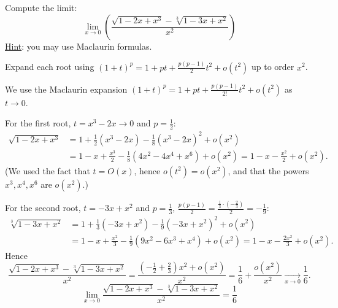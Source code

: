 
\begin{question}
Compute the limit:
\[ \lim_{x\to0}\left(\frac{\sqrt{1-2x+x^3}-\sqrt[3]{1-3x+x^2}}{x^2}\right) \]
\underline{Hint}: you may use Maclaurin formulas.
\end{question}

\begin{hint}
Expand each root using $(1+t)^p=1+pt+\frac{p(p-1)}{2}t^2+o(t^2)$ up to order $x^2$.
\end{hint}

\begin{solution}
We use the Maclaurin expansion $(1+t)^p=1+pt+\frac{p(p-1)}{2!}t^2+o(t^2)$ as $t\to0$.

For the first root, $t=x^3-2x\to0$ and $p=\frac12$:
\begin{align*}
\sqrt{1-2x+x^3}&=1+\frac12(x^3-2x)-\frac18(x^3-2x)^2+o(x^2)\\
&=1-x+\frac{x^3}{2}-\frac18\left(4x^2-4x^4+x^6\right)+o(x^2)=1-x-\frac{x^2}{2}+o(x^2).
\end{align*}
(We used the fact that $t=O(x)$, hence $o(t^2)=o(x^2)$, and that the powers $x^3,x^4,x^6$ are $o(x^2)$.)

For the second root, $t=-3x+x^2$ and $p=\frac13$, $\frac{p(p-1)}{2}=\frac{\frac13\cdot(-\frac23)}{2}=-\frac19$:
\begin{align*}
\sqrt[3]{1-3x+x^2}&=1+\frac13(-3x+x^2)-\frac19(-3x+x^2)^2+o(x^2)\\
&=1-x+\frac{x^2}{3}-\frac19\left(9x^2-6x^3+x^4\right)+o(x^2)=1-x-\frac{2x^2}{3}+o(x^2).
\end{align*}
Hence
\[ \frac{\sqrt{1-2x+x^3}-\sqrt[3]{1-3x+x^2}}{x^2}=\frac{\left(-\frac12+\frac23\right)x^2+o(x^2)}{x^2}=\frac16+\frac{o(x^2)}{x^2}\xrightarrow[x\to0]{}\frac16. \]
\[ \boxed{\lim_{x\to0}\frac{\sqrt{1-2x+x^3}-\sqrt[3]{1-3x+x^2}}{x^2}=\frac16} \]
\end{solution}
